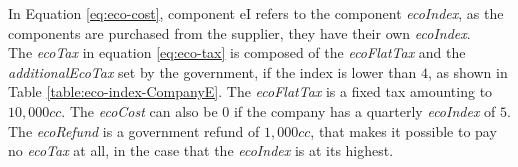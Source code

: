 In Equation \ref{eq:eco-cost}, component eI refers to the component  \textit{ecoIndex}, as the components are purchased from the supplier, they have their own \textit{ecoIndex}.\\
The \textit{ecoTax} in equation \ref{eq:eco-tax} is composed of the \textit{ecoFlatTax} and the \textit{additionalEcoTax} set by the government, if the index is lower than $4$, as shown in Table \ref{table:eco-index-CompanyE}.
The \textit{ecoFlatTax} is a fixed tax amounting to $10,000cc$. The \textit{ecoCost} can also be $0$ if the company has a quarterly  \textit{ecoIndex} of $5$. The  \textit{ecoRefund} is a government refund of $1,000cc$, that makes it possible to pay no \textit{ecoTax} at all, in the case that the \textit{ecoIndex} is at its highest. 